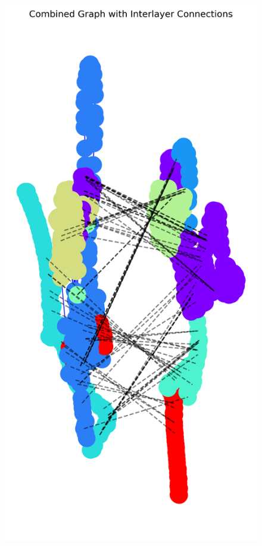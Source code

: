 \documentclass[10pt,letterpaper]{article}
\begin{document}
\begin{figure}[h!]
\begin{minipage}[b]{0.25\linewidth}
		\subcaption{}
	\end{minipage}
	\hspace{0.5cm}
	\begin{minipage}[b]{0.25\linewidth}
		\centering
		\includegraphics[width=\textwidth]{figs/fig8.png}

\end{minipage}
\end{figure}
\end{document}

